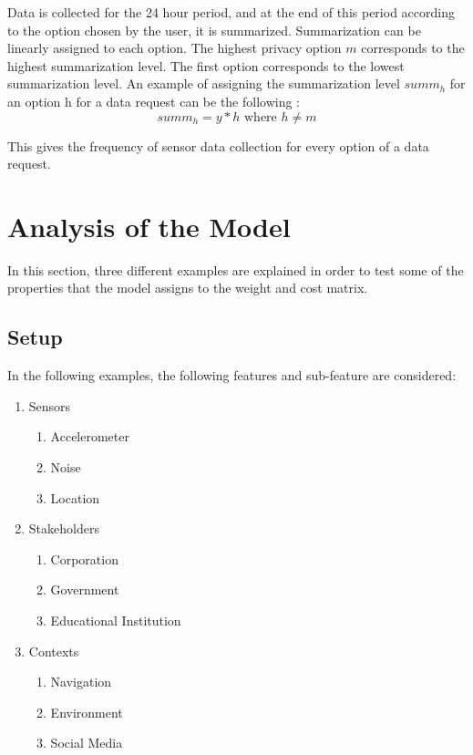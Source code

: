 Data is collected for the 24 hour period, and at the end of this period according to the option chosen by the user, it is summarized. Summarization can
be linearly assigned to each option.
The highest privacy option $m$ corresponds to the highest summarization level. The first option corresponds to the lowest summarization level. An example of assigning the summarization level $summ_{h}$ for an option h for a data request can be the following :
\begin{equation}
summ_{h} = y*h \text{ where } h \neq m
\end{equation}

This gives the frequency of sensor data collection for every option of a data request.

\section{Analysis of the Model} \label{analysis_model}
In this section, three different examples are explained in order to test some of the properties that the model assigns to the 
weight and cost matrix.

\subsection{Setup}
In the following examples, the following features and sub-feature are considered:

\begin{enumerate}
    \item Sensors
    \begin{enumerate}
    \item Accelerometer 
    \item Noise 
    \item Location 
   \end{enumerate}
    \item Stakeholders 
    \begin{enumerate}
    \item Corporation 
    \item Government 
    \item Educational Institution 
   \end{enumerate}
   \item Contexts
    \begin{enumerate}
    \item Navigation 
    \item Environment 
    \item Social Media 
   \end{enumerate}
 \end{enumerate}
 
